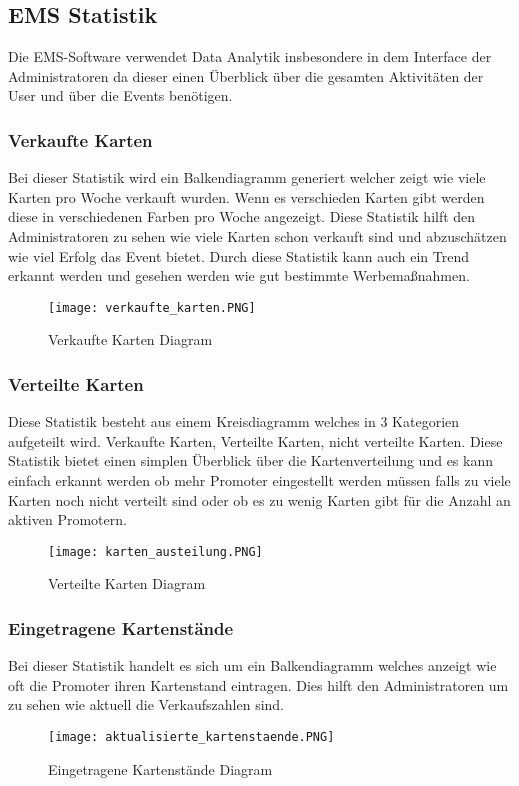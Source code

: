 \subsection{EMS Statistik}
Die EMS-Software verwendet Data Analytik insbesondere in dem Interface der Administratoren da dieser einen Überblick über die gesamten Aktivitäten der User und über die Events benötigen.  			
\subsubsection{Verkaufte Karten}
Bei dieser Statistik wird ein Balkendiagramm generiert welcher zeigt wie viele Karten pro Woche verkauft wurden. Wenn es verschieden Karten gibt werden diese in verschiedenen Farben pro Woche angezeigt. 
Diese Statistik hilft den Administratoren zu sehen wie viele Karten schon verkauft sind und abzuschätzen wie viel Erfolg das Event bietet. Durch diese Statistik kann auch ein Trend erkannt werden und gesehen werden wie gut bestimmte Werbemaßnahmen.	
\begin{figure}[H]
	\centering
	\texttt{[image: verkaufte\_karten.PNG]}
	\caption{Verkaufte Karten Diagram}
\end{figure}
\subsubsection{Verteilte Karten}
Diese Statistik besteht aus einem Kreisdiagramm welches in 3 Kategorien aufgeteilt wird. Verkaufte Karten, Verteilte Karten, nicht verteilte Karten. 
Diese Statistik bietet einen simplen Überblick über die Kartenverteilung und es kann einfach erkannt werden ob mehr Promoter eingestellt werden müssen falls zu viele Karten noch nicht verteilt sind oder ob es zu wenig Karten gibt für die Anzahl an aktiven Promotern. 	
\begin{figure}[H]
	\centering
	\texttt{[image: karten\_austeilung.PNG]}
	\caption{Verteilte Karten Diagram}
	\end{figure}
\subsubsection{Eingetragene Kartenstände}
Bei dieser Statistik handelt es sich um ein Balkendiagramm welches anzeigt wie oft die Promoter ihren Kartenstand eintragen. Dies hilft den Administratoren um zu sehen wie aktuell die Verkaufszahlen sind.
\begin{figure}[H]
	\centering
	\texttt{[image: aktualisierte\_kartenstaende.PNG]}
	\caption{Eingetragene Kartenstände Diagram}
\end{figure}
